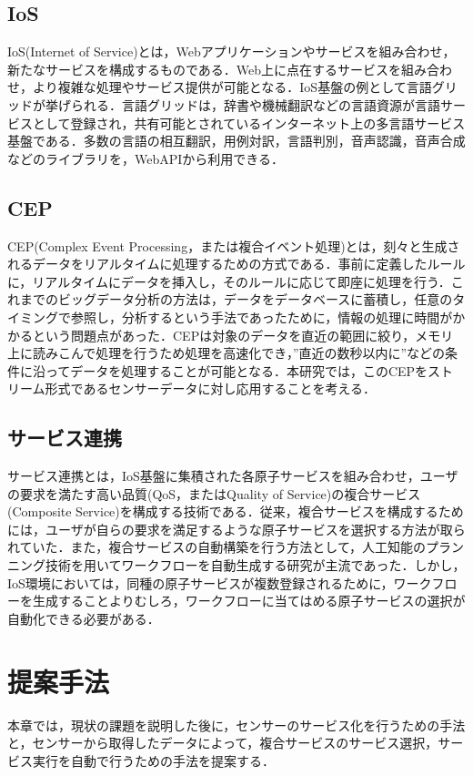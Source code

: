\documentclass{kuisthesis}			%
\begin{document}
\subsection{IoS}\label{subsec-abstract}
IoS(Internet of Service)とは，Webアプリケーションやサービスを組み合わせ，新たなサービスを構成するものである．Web上に点在するサービスを組み合わせ，より複雑な処理やサービス提供が可能となる．IoS基盤の例として言語グリッドが挙げられる．言語グリッドは，辞書や機械翻訳などの言語資源が言語サービスとして登録され，共有可能とされているインターネット上の多言語サービス基盤である．多数の言語の相互翻訳，用例対訳，言語判別，音声認識，音声合成などのライブラリを，WebAPIから利用できる．

\subsection{CEP}
CEP(Complex Event Processing，または複合イベント処理)とは，刻々と生成されるデータをリアルタイムに処理するための方式である．事前に定義したルールに，リアルタイムにデータを挿入し，そのルールに応じて即座に処理を行う．これまでのビッグデータ分析の方法は，データをデータベースに蓄積し，任意のタイミングで参照し，分析するという手法であったために，情報の処理に時間がかかるという問題点があった．CEPは対象のデータを直近の範囲に絞り，メモリ上に読みこんで処理を行うため処理を高速化でき，”直近の数秒以内に”などの条件に沿ってデータを処理することが可能となる．本研究では，このCEPをストリーム形式であるセンサーデータに対し応用することを考える．

\subsection{サービス連携}
サービス連携とは，IoS基盤に集積された各原子サービスを組み合わせ，ユーザの要求を満たす高い品質(QoS，またはQuality of Service)の複合サービス(Composite Service)を構成する技術である．従来，複合サービスを構成するためには，ユーザが自らの要求を満足するような原子サービスを選択する方法が取られていた．また，複合サービスの自動構築を行う方法として，人工知能のプランニング技術を用いてワークフローを自動生成する研究が主流であった．しかし，IoS環境においては，同種の原子サービスが複数登録されるために，ワークフローを生成することよりむしろ，ワークフローに当てはめる原子サービスの選択が自動化できる必要がある．

\section{提案手法}
本章では，現状の課題を説明した後に，センサーのサービス化を行うための手法と，センサーから取得したデータによって，複合サービスのサービス選択，サービス実行を自動で行うための手法を提案する．
\end{document}
